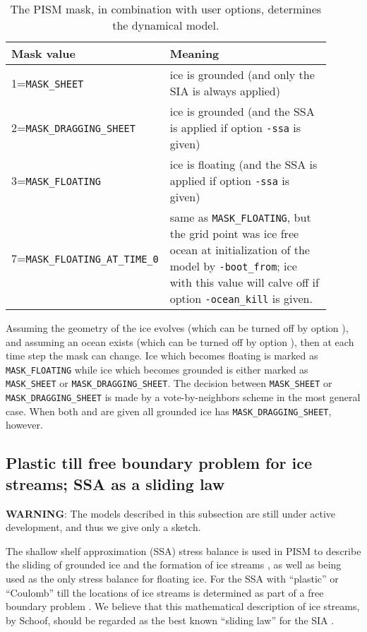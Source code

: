 \begin{table}[ht]
\caption{The PISM mask, in combination with user options, determines the dynamical model.}\label{tab:maskvals} 
\small
\begin{tabular}{p{0.35\linewidth}p{0.55\linewidth}}\hline
\textbf{Mask value} & \textbf{Meaning}\\ \hline
1=\texttt{MASK_SHEET} & ice is grounded (and only the SIA is always applied) \\
2=\texttt{MASK_DRAGGING_SHEET} & ice is grounded (and the SSA is applied if option \texttt{-ssa} is given) \\
3=\texttt{MASK_FLOATING} & ice is floating (and the SSA is applied if option \texttt{-ssa} is given) \\
7=\texttt{MASK_FLOATING_AT_TIME_0} & same as \texttt{MASK_FLOATING}, but the grid point was ice free ocean at initialization of the model by \texttt{-boot_from}; ice with this value will calve off if option \texttt{-ocean_kill} is given.\\
\hline\end{tabular}
\normalsize
\end{table}

Assuming the geometry of the ice evolves (which can be turned off by option ), and assuming an ocean exists (which can be turned off by option ), then at each time step the mask can change.  Ice which becomes floating is marked as \texttt{MASK_FLOATING} while ice which becomes grounded is either marked as \texttt{MASK_SHEET} or \texttt{MASK_DRAGGING_SHEET}.  The decision between \texttt{MASK_SHEET} or \texttt{MASK_DRAGGING_SHEET} is made by a vote-by-neighbors scheme in the most general case.  When both  and  are given all grounded ice has \texttt{MASK_DRAGGING_SHEET}, however.

\subsection{Plastic till free boundary problem for ice streams; SSA as a sliding law}  \label{subsect:plastic}
\renewcommand{\optindexsection}{SSA as a sliding law}

\textbf{WARNING}: The models described in this subsection are still under active development, and thus we give only a sketch.

The shallow shelf approximation (SSA) stress balance is used in PISM to describe the sliding of grounded ice and the formation of ice streams \cite{BBssasliding}, as well as being used as the only stress balance for floating ice.  For the SSA with ``plastic'' or ``Coulomb'' till the locations of ice streams is determined as part of a free boundary problem \cite{SchoofStream}.  We believe that this mathematical description of ice streams, by Schoof, should be regarded as the best known ``sliding law'' for the SIA \cite{BBssasliding}.

